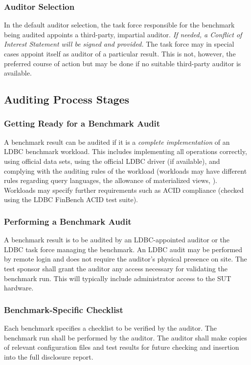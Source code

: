 \subsubsection{Auditor Selection}
In the default auditor selection, the task force responsible for the benchmark being audited appoints a third-party, impartial auditor. \emph{If needed, a Conflict of Interest Statement will be signed and provided.} The task force may in special cases appoint itself as auditor of a particular result. This is not,
however, the preferred course of action but may be done if no suitable third-party auditor is available.


\subsection{Auditing Process Stages}
\subsubsection{Getting Ready for a Benchmark Audit}
A benchmark result can be audited if it is a \emph{complete implementation} of an LDBC benchmark workload. This includes implementing all operations correctly, using official data sets, using the official LDBC driver (if available), and complying with the auditing rules of the workload (\eg workloads may have different rules regarding query languages, the allowance of materialized views, \etc).
Workloads may specify further requirements such as ACID compliance (checked using the LDBC FinBench ACID test suite).

\subsubsection{Performing a Benchmark Audit}
A benchmark result is to be audited by an LDBC-appointed auditor or the LDBC task force managing the benchmark. An LDBC audit may be performed by remote login and does not require the auditor's physical presence on site. The test sponsor shall grant the auditor any access necessary for validating the benchmark run. This will typically include administrator access to the SUT hardware.

\subsubsection{Benchmark-Specific Checklist}
Each benchmark specifies a checklist to be verified by the auditor. The benchmark run shall be performed by the auditor. The auditor shall make copies of relevant configuration files and test results for future checking and insertion into the full disclosure report.

